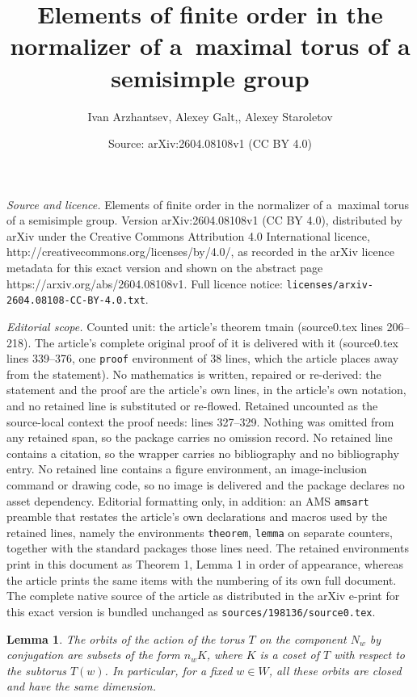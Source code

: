 \documentclass[10pt,a4paper]{amsart}
\title{Elements of finite order in the normalizer of a~maximal torus of a semisimple group}
\author{Ivan Arzhantsev, Alexey Galt,, Alexey Staroletov}
\date{Source: arXiv:2604.08108v1 (CC BY 4.0)}
\newtheorem{lemma}{Lemma}
\begin{document}
\maketitle

\noindent\emph{Source and licence.} Elements of finite order in the normalizer of a~maximal torus of a semisimple group. Version arXiv:2604.08108v1 (CC BY 4.0), distributed by arXiv under the Creative Commons Attribution 4.0 International licence, http://creativecommons.org/licenses/by/4.0/, as recorded in the arXiv licence metadata for this exact version and shown on the abstract page https://arxiv.org/abs/2604.08108v1. Full licence notice: \texttt{licenses/arxiv-2604.08108-CC-BY-4.0.txt}.\par\smallskip

\noindent\textit{Editorial scope.} Counted unit: the article's theorem tmain (source0.tex lines 206--218). The article's complete original proof of it is delivered with it (source0.tex lines 339--376, one \texttt{proof} environment of 38 lines, which the article places away from the statement). No mathematics is written, repaired or re-derived: the statement and the proof are the article's own lines, in the article's own notation, and no retained line is substituted or re-flowed.  Retained uncounted as the source-local context the proof needs: lines 327--329.  Nothing was omitted from any retained span, so the package carries no omission record.  No retained line contains a citation, so the wrapper carries no bibliography and no bibliography entry.  No retained line contains a figure environment, an image-inclusion command or drawing code, so no image is delivered and the package declares no asset dependency.  Editorial formatting only, in addition: an AMS \texttt{amsart} preamble that restates the article's own declarations and macros used by the retained lines, namely the environments \texttt{theorem}, \texttt{lemma} on separate counters, together with the standard packages those lines need.  The retained environments print in this document as Theorem 1, Lemma 1 in order of appearance, whereas the article prints the same items with the numbering of its own full document.  The complete native source of the article as distributed in the arXiv e-print for this exact version is bundled unchanged as \texttt{sources/198136/source0.tex}.
\begin{lemma} \label{lem}
The orbits of the action of the torus $T$ on the component $N_w$ by conjugation are subsets of the form $n_wK$, where $K$ is a coset of $T$ with respect to the subtorus $T(w)$. In particular, for a fixed $w\in W$, all these orbits are closed and have the same dimension.
\end{lemma}
\end{document}
